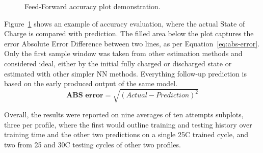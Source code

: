 %
%
 {
\begin{figure}[ht]
    \centering
    
    \caption{Feed-Forward accuracy plot demonstration.}
    \label{fig:plot_demo}
\end{figure}
Figure~\ref{fig:plot_demo} shows an example of accuracy evaluation, where the actual State of Charge is compared with prediction.
The filled area below the plot captures the error Absolute Error Difference between two lines, as per Equation~\ref{eq:abs-error}.
Only the first sample window was taken from other estimation methods and considered ideal, either by the initial fully charged or discharged state or estimated with other simpler NN methods.
Everything follow-up prediction is based on the early produced output of the same model.
\begin{equation}
    \textbf{ABS error}  = \sqrt{(Actual-Prediction)^2}
    \label{eq:abs-error}
\end{equation}
}
{Overall, the results were reported on nine averages of ten attempts subplots, three per profile, where the first would outline training and testing history over training time and the other two predictions on a single 25\textdegree{}C trained cycle, and two from 25 and 30\textdegree{}C testing cycles of other two profiles.}
